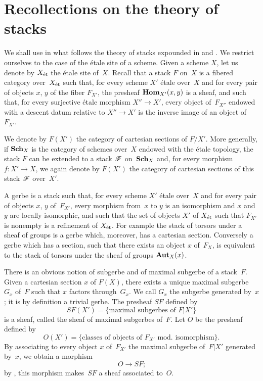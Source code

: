 \section{Recollections on the theory of stacks}
\label{XIII.0}

We shall use in what follows the theory of stacks
expounded in \cite{XIII.1} and \cite{XIII.2}. We restrict ourselves to the case of the
\'etale site of a scheme. Given a scheme $X$, let us denote by
$X_{\mathrm{\acute{e}t}}$ the \'etale site of~$X$. Recall that a
stack $F$
on~$X$ is a fibered category over~$X_{\mathrm{\acute{e}t}}$ such
that, for every scheme $X'$ \'etale over~$X$ and for every pair
of objects
$x$, $y$ of the fiber $F_{X'}$, the presheaf
$\operatorname{\mathbf{Hom}}_{X'}(x,y)$ is a sheaf, and such that, for every
surjective \'etale morphism $X'' \to X'$, every object of~$F_{X''}$
endowed with a descent datum relative to $X'' \to X'$ is the
inverse image of an object of~$F_{X'}$.

We denote by $F(X')$ the category of cartesian sections of
$F/X'$. More generally, if $\mathbf{Sch}_X$ is the category
of schemes over~$X$ endowed with the \'etale topology, the
stack $F$ can be extended to a stack $\cal{F}$ on~$\mathbf{Sch}_X$ and,
for every morphism $f\colon X' \to X$, we again denote by $F(X')$ the
category of cartesian sections of this stack $\cal{F}$
over~$X'$.

A gerbe
is a stack such that, for every scheme $X'$ \'etale
over~$X$ and for every pair of objects $x$, $y$ of~$F_{X'}$, every
morphism from~$x$ to $y$ is an isomorphism and $x$ and $y$ are
locally isomorphic, and such that the set of objects $X'$ of
$X_{\mathrm{\acute{e}t}}$ such that $F_{X'}$ is nonempty is a refinement of
$X_{\mathrm{\acute{e}t}}$. For example the stack of torsors under a sheaf of groups
is a gerbe which, moreover, has a cartesian section.
Conversely a gerbe which has a section, \ie such that there
exists an object $x$ of~$F_X$, is equivalent to the stack of
torsors under the sheaf
of groups $\operatorname{\mathbf{Aut}}_X(x)$.

There is an obvious notion of subgerbe and of maximal subgerbe
of a stack~$F$. Given a cartesian section $x$ of
$F(X)$, there exists a unique maximal subgerbe $G_x$ of~$F$ such
that $x$ factors through~$G_x$. We call $G_x$ the
subgerbe generated by~$x$; it is by definition a trivial
gerbe.
The presheaf $SF$
defined by
$$
SF(X') = \{ \text{maximal subgerbes of }F|X' \}
$$
is a sheaf, called the sheaf of maximal subgerbes
of~$F$.
Let $O$ be the presheaf defined by
$$
O(X') = \{ \text{classes of objects of }F_{X'}\text{ mod. isomorphism}
\} \text{.}
$$
By associating to every object $x$ of~$F_{X'}$ the maximal subgerbe
of~$F|X'$ generated by~$x$, we obtain a morphism
$$
O \to SF \text{;}
$$
by \cite[III 2.1.4]{XIII.2}, this morphism makes~$SF$ a sheaf
associated to~$O$.

